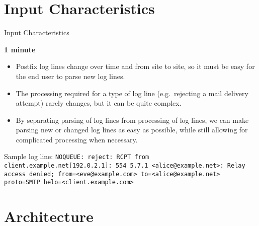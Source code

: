\documentclass{beamer}
\newcommand{\timingnote}[1]{%
    \textbf{#1}%
}
\begin{document}
\section{Input Characteristics}

\begin{frame}{Input Characteristics}

    \timingnote{1 minute}

    \begin{itemize}

        \item Postfix log lines change over time and from site to site, so
            it must be easy for the end user to parse new log lines.

        \item The processing required for a type of log line (e.g.\
            rejecting a mail delivery attempt) rarely changes, but it can
            be quite complex.

        \item By separating parsing of log lines from processing of log
            lines, we can make parsing new or changed log lines as easy as
            possible, while still allowing for complicated processing when
            necessary.

    \end{itemize}

    Sample log line: \texttt{NOQUEUE\@: reject: RCPT from
    client.example.net[192.0.2.1]: 554 5.7.1 <alice@example.net>: Relay
    access denied; from=<eve@example.com> to=<alice@example.net> proto=SMTP
    helo=<client.example.com>}

\end{frame}


\section{Architecture}
\end{document}
